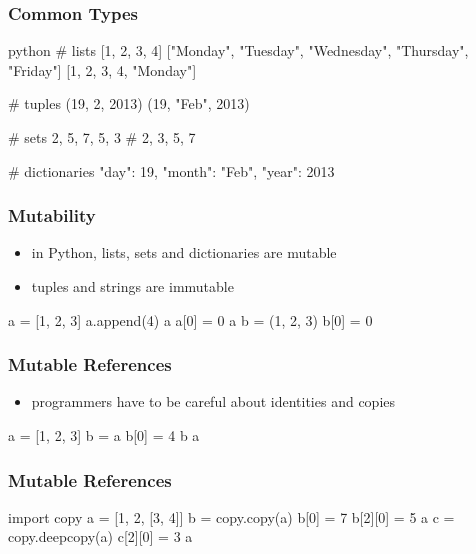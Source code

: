 \documentclass[dvipsnames]{beamer}
\theoremstyle{plain}
\begin{document}
\begin{frame}[fragile]
  \frametitle{Common Types}

  \begin{example}[Python]
    \begin{pygments}{python}
# lists
[1, 2, 3, 4]
["Monday", "Tuesday", "Wednesday", "Thursday", "Friday"]
[1, 2, 3, 4, "Monday"]

# tuples
(19, 2, 2013)
(19, "Feb", 2013)

# sets
{2, 5, 7, 5, 3}         # {2, 3, 5, 7}

# dictionaries
{"day": 19, "month": "Feb", "year": 2013}
    \end{pygments}
  \end{example}
\end{frame}

\begin{frame}[fragile]
  \frametitle{Mutability}

  \begin{itemize}
    \item in Python, lists, sets and dictionaries are mutable
    \item tuples and strings are immutable
  \end{itemize}

  \begin{example}[Python]
    \begin{pyconsole}[pymut]
a = [1, 2, 3]
a.append(4)
a
a[0] = 0
a
b = (1, 2, 3)
b[0] = 0
    \end{pyconsole}
  \end{example}
\end{frame}

\begin{frame}[fragile]
  \frametitle{Mutable References}

  \begin{itemize}
    \item programmers have to be careful about identities and copies
  \end{itemize}

  \begin{example}[Python]
    \begin{pyconsole}[pymutref]
a = [1, 2, 3]
b = a
b[0] = 4
b
a
    \end{pyconsole}
  \end{example}
\end{frame}

\begin{frame}[fragile]
  \frametitle{Mutable References}

  \begin{example}[Python]
    \begin{pyconsole}[pycopy]
import copy
a = [1, 2, [3, 4]]
b = copy.copy(a)
b[0] = 7
b[2][0] = 5
a
c = copy.deepcopy(a)
c[2][0] = 3
a
    \end{pyconsole}
  \end{example}
\end{frame}
\end{document}
